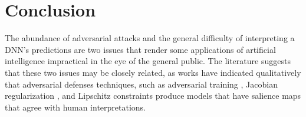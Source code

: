 



\section{Conclusion} \label{sec:conclusion}
The abundance of adversarial attacks and the general difficulty of interpreting a DNN's predictions are two issues that render some applications of artificial intelligence impractical in the eye of the general public. The literature suggests that these two issues may be closely related, as works have indicated qualitatively that adversarial defenses techniques, such as adversarial training \cite{robustness_vs_accuracy}, Jacobian regularization  \cite{input_grad_reg}, and Lipschitz constraints \cite{robustness_interpretability} produce models that have salience maps that agree with human interpretations. 

